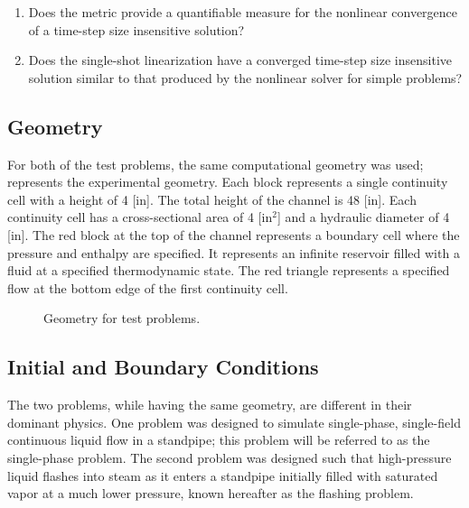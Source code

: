 \begin{enumerate}
\item{Does the metric provide a quantifiable measure for the nonlinear convergence of a time-step size insensitive solution?}
\item{Does the single-shot linearization have a converged time-step size insensitive solution similar to that produced by the nonlinear solver for simple problems?}
\end{enumerate}

\subsection{Geometry}
\label{subsect:experimental_geometry}
For both of the test problems, the same computational geometry was used;   represents the experimental geometry.
Each block represents a single continuity cell with a height of 4 [in].
The total height of the channel is 48 [in].
Each continuity cell has a cross-sectional area of 4 [in$^2$] and a hydraulic diameter of 4 [in].
The red block at the top of the channel represents a boundary cell where the pressure and enthalpy are specified.
It represents an infinite reservoir filled with a fluid at a specified thermodynamic state.
The red triangle represents a specified flow at the bottom edge of the first continuity cell. 

\begin{figure}[h!t]
\begin{center}
\end{center}
\caption{Geometry for test problems.}
\label{fig:exp_geometry}
\end{figure}

\subsection{Initial and Boundary Conditions}
\label{subsect:ic_bc}

The two problems, while having the same geometry, are different in their dominant physics.
One problem was designed to simulate single-phase, single-field continuous liquid flow in a standpipe; this problem will be referred to as the single-phase problem.
The second problem was designed such that high-pressure liquid flashes into steam as it enters a standpipe initially filled with saturated vapor at a much lower pressure, known hereafter as the flashing problem.

